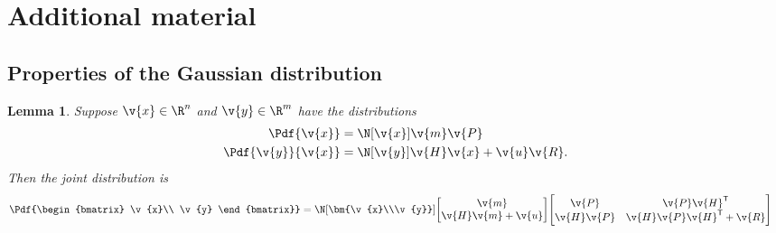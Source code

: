 \documentclass[english,12pt]{article}
\newcommand{\y}{\v{y}}
\newcommand{\x}{\v{x}}
\newcommand{\tr}{\mathsf{T}}
\newtheorem{lemma}{Lemma}
\theoremstyle{definition}
\begin{document}
\section{Additional material}
\subsection{Properties of the Gaussian distribution}
\begin{lemma} \label{lemma:gaussian_joint}
Suppose $\x\in\R^n$ and $\y\in\R^m$ have the distributions
\begin{align*}
	\Pdf{\x}&= \N[\x]{\v{m}}{\v{P}} \\
	\Pdf{\y}{\x}&= \N[\y]{\v{H}\x+\v{u}}{\v{R}}.
\end{align*}
Then the joint distribution is
\begin{align*}
	\Pdf{\begin{bmatrix}
		\x\\
		\y
	\end{bmatrix}}&=
	\N[\bm{\x\\\y}]{
	\begin{bmatrix}
		\v{m}\\
		\v{H}\v{m}+\v{u}
	\end{bmatrix}
	}{
	\begin{bmatrix}
		\v{P}&\v{P}\v{H}^\tr\\
		\v{H}\v{P}&\v{H}\v{P}\v{H}^\tr+\v{R}\\
	\end{bmatrix}
	}
\end{align*}
\end{lemma}
\end{document}
